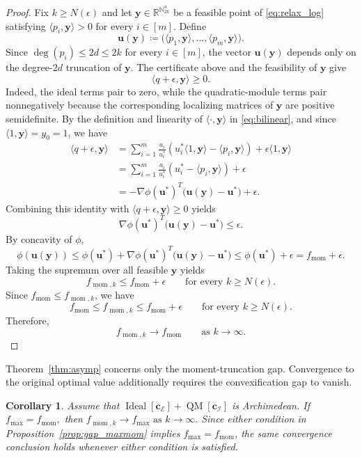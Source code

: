 \documentclass[pdflatex,sn-mathphys-num]{sn-jnl}%
\newcommand{\vect}[1]{\boldsymbol{#1}}
\theoremstyle{thmstyleone}%
\newtheorem{corollary}[theorem]{Corollary}
\theoremstyle{thmstyletwo}%
\theoremstyle{thmstylethree}%
\begin{document}
{\begin{proof}
Fix $k\geq N(\epsilon)$ and let
$\vect{y}\in\mathbb{R}^{\mathbb{N}_{2k}^n}$ be a feasible point of
\eqref{eq:relax_log} satisfying
$\langle p_i,\vect{y}\rangle>0$ for every $i\in[m]$. Define
\[
\vect{u}(\vect{y})\coloneqq
\big(\langle p_1,\vect{y}\rangle,\ldots,\langle p_m,\vect{y}\rangle\big).
\]
Since $\deg(p_i)\leq2d\leq2k$ for every $i\in[m]$, the vector $\vect{u}(\vect{y})$
depends only on the degree-$2d$ truncation of $\vect{y}$.
The certificate above and the feasibility of $\vect{y}$ give
\[
\langle q+\epsilon,\vect{y}\rangle\geq0.
\]
Indeed, the ideal terms pair to zero, while the quadratic-module
terms pair nonnegatively because the corresponding localizing matrices
of $\vect{y}$ are positive semidefinite.
By the definition and linearity of $\langle\cdot,\vect{y}\rangle$ in
\eqref{eq:bilinear}, and since $\langle1,\vect{y}\rangle=y_0=1$, we have
\begin{align*}
\langle q+\epsilon,\vect{y}\rangle
&=
\sum_{i=1}^m\frac{a_i}{u_i^*}
\left(
u_i^*\langle1,\vect{y}\rangle-\langle p_i,\vect{y}\rangle
\right)
+\epsilon\langle1,\vect{y}\rangle\\
&=
\sum_{i=1}^m\frac{a_i}{u_i^*}
\left(
u_i^*-\langle p_i,\vect{y}\rangle
\right)
+\epsilon\\
&=
-\nabla\phi(\vect{u}^*)^T\big(\vect{u}(\vect{y})-\vect{u}^*\big)+\epsilon.
\end{align*}
Combining this identity with
$\langle q+\epsilon,\vect{y}\rangle\geq0$ yields
\[
\nabla\phi(\vect{u}^*)^T\big(\vect{u}(\vect{y})-\vect{u}^*\big)\leq\epsilon.
\]
By concavity of $\phi$,
\[
\phi(\vect{u}(\vect{y}))
\leq
\phi(\vect{u}^*)+
\nabla\phi(\vect{u}^*)^T\big(\vect{u}(\vect{y})-\vect{u}^*\big)
\leq
\phi(\vect{u}^*)+\epsilon
=
f_{\operatorname{mom}}+\epsilon.
\]
Taking the supremum over all feasible $\vect{y}$ yields
\[
f_{\operatorname{mom},k}
\leq f_{\operatorname{mom}}+\epsilon
\qquad
\text{for every }k\geq N(\epsilon).
\]
Since $f_{\operatorname{mom}}\leq f_{\operatorname{mom},k}$, we have
\[
f_{\operatorname{mom}}
\leq f_{\operatorname{mom},k}
\leq f_{\operatorname{mom}}+\epsilon
\qquad
\text{for every }k\geq N(\epsilon).
\]
Therefore,
\[
f_{\operatorname{mom},k}
\longrightarrow f_{\operatorname{mom}}
\qquad\text{as }k\to\infty.
\]
\end{proof}
}

Theorem~\ref{thm:asymp} concerns only the moment-truncation gap.
Convergence to the original optimal value additionally requires the
convexification gap to vanish.

\begin{corollary}\label{cor:asymp}
Assume that
$\operatorname{Ideal}[\vect{c}_{\mathcal{E}}]
+\operatorname{QM}[\vect{c}_{\mathcal{I}}]$
is Archimedean. If
$f_{\max}=f_{\operatorname{mom}},$
then
$f_{\operatorname{mom},k}\longrightarrow f_{\max}\text{ as }k\to\infty.$
Since either condition in Proposition~\ref{prop:gap_maxmom} implies
$f_{\max}=f_{\operatorname{mom}}$, the same convergence conclusion
holds whenever either condition is satisfied.
\end{corollary}
\end{document}
